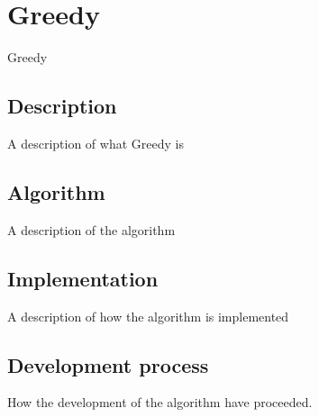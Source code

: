 \section{Greedy}
Greedy\par
\subsection{Description}
A description of what Greedy is
\subsection{Algorithm}
A description of the algorithm
\subsection{Implementation}
A description of how the algorithm is implemented
\subsection{ Development process}
How the development of the algorithm have proceeded.